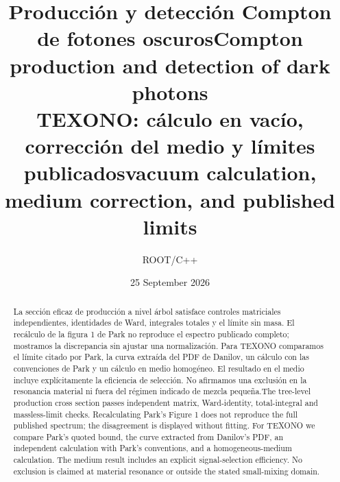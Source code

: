 \newcommand{\both}[2]{\ifspanish #2\else #1\fi}
\newcommand{\slsh}[1]{\not\!#1}
\setlength{\emergencystretch}{2em}
\ifspanish\renewcommand{\abstractname}{Resumen}\renewcommand{\figurename}{Figura}\renewcommand{\refname}{Referencias}\fi
\title{\both{Compton production and detection of dark photons}{Producción y detección Compton de fotones oscuros}\\\large TEXONO: \both{vacuum calculation, medium correction, and published limits}{cálculo en vacío, corrección del medio y límites publicados}}
\author{ROOT/C++}\date{25 September 2026}
\maketitle
\begin{abstract}
\both{The tree-level production cross section passes independent matrix, Ward-identity, total-integral and massless-limit checks. Recalculating Park's Figure 1 does not reproduce the full published spectrum; the disagreement is displayed without fitting. For TEXONO we compare Park's quoted bound, the curve extracted from Danilov's PDF, an independent calculation with Park's conventions, and a homogeneous-medium calculation. The medium result includes an explicit signal-selection efficiency. No exclusion is claimed at material resonance or outside the stated small-mixing domain.}
{La sección eficaz de producción a nivel árbol satisface controles matriciales independientes, identidades de Ward, integrales totales y el límite sin masa. El recálculo de la figura 1 de Park no reproduce el espectro publicado completo; mostramos la discrepancia sin ajustar una normalización. Para TEXONO comparamos el límite citado por Park, la curva extraída del PDF de Danilov, un cálculo con las convenciones de Park y un cálculo en medio homogéneo. El resultado en el medio incluye explícitamente la eficiencia de selección. No afirmamos una exclusión en la resonancia material ni fuera del régimen indicado de mezcla pequeña.}
\end{abstract}
